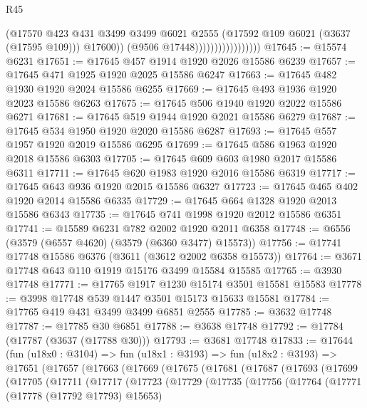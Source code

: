 \begin{lexlean}{R45}
\begin{coremodule}
                                      (@17570
                                        @423
                                        @431
                                        @3499
                                        @3499
                                        @6021
                                        @2555
                                        (@17592 @109 @6021 (@3637 (@17595 @109)))
                                        @17600))
                                    (@9506 @17448)))))))))))))))))
@17645 := @15574 @6231
@17651 := @17645 @457 @1914 @1920 @2026 @15586 @6239
@17657 := @17645 @471 @1925 @1920 @2025 @15586 @6247
@17663 := @17645 @482 @1930 @1920 @2024 @15586 @6255
@17669 := @17645 @493 @1936 @1920 @2023 @15586 @6263
@17675 := @17645 @506 @1940 @1920 @2022 @15586 @6271
@17681 := @17645 @519 @1944 @1920 @2021 @15586 @6279
@17687 := @17645 @534 @1950 @1920 @2020 @15586 @6287
@17693 := @17645 @557 @1957 @1920 @2019 @15586 @6295
@17699 := @17645 @586 @1963 @1920 @2018 @15586 @6303
@17705 := @17645 @609 @603 @1980 @2017 @15586 @6311
@17711 := @17645 @620 @1983 @1920 @2016 @15586 @6319
@17717 := @17645 @643 @936 @1920 @2015 @15586 @6327
@17723 := @17645 @465 @402 @1920 @2014 @15586 @6335
@17729 := @17645 @664 @1328 @1920 @2013 @15586 @6343
@17735 := @17645 @741 @1998 @1920 @2012 @15586 @6351
@17741 := @15589 @6231 @782 @2002 @1920 @2011 @6358
@17748 := @6556 (@3579 (@6557 @4620) (@3579 (@6360 @3477) @15573))
@17756 := @17741 @17748 @15586 @6376 (@3611 (@3612 @2002 @6358 @15573))
@17764 := @3671 @17748 @643 @110 @1919 @15176 @3499 @15584 @15585
@17765 := @3930 @17748
@17771 := @17765 @1917 @1230 @15174 @3501 @15581 @15583
@17778 := @3998 @17748 @539 @1447 @3501 @15173 @15633 @15581
@17784 := @17765 @419 @431 @3499 @3499 @6851 @2555
@17785 := @3632 @17748
@17787 := @17785 @30 @6851
@17788 := @3638 @17748
@17792 := @17784 (@17787 (@3637 (@17788 @30)))
@17793 := @3681 @17748
@17833 := @17644
    (fun (u18x0 : @3104) =>
    fun (u18x1 : @3193) =>
    fun (u18x2 : @3193) =>
    @17651
      (@17657
        (@17663
          (@17669
            (@17675
              (@17681
                (@17687
                  (@17693
                    (@17699
                      (@17705
                        (@17711
                          (@17717
                            (@17723
                              (@17729
                                (@17735
                                  (@17756
                                    (@17764
                                      (@17771
                                        (@17778 (@17792 @17793) @15653)

\end{coremodule}
\end{lexlean}
